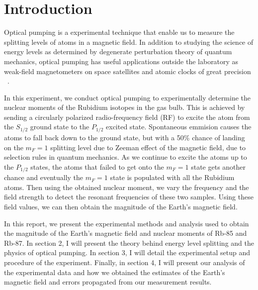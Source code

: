 \documentclass{sigchi}
\begin{document}
\section{Introduction}\label{sec:intro}
\par Optical pumping is a experimental technique that enable us to measure the splitting levels of  atoms in a magnetic field.  In addition to studying the science of energy levels as determined by degenerate perturbation theory of quantum mechanics, optical pumping has useful applications outside the laboratory as weak-field magnetometers on space satellites and atomic clocks of great precision ~\cite{opt}. 
\par In this experiment, we conduct optical pumping to experimentally determine the nuclear moments of the Rubidium isotopes in the gas bulb. This is achieved by sending a circularly polarized radio-frequency field (RF)  to excite the atom from the  $S_{1/2}$ ground state to the $P_{1/2}$ excited state. Spontaneous emmision causes the atoms to fall back down to the ground state, but with a 50\% chance of landing on the  $m_F=1$ splitting level due to Zeeman effect of the magnetic field, due to selection rules in quantum mechanics. As we continue to excite the atoms up to the $P_{1/2}$ states, the  atoms that failed to get onto the $m_F=1$ state gets another chance and eventually the $m_F=1$ state is populated with all the Rubidium atoms. Then using the obtained nuclear moment, we vary the frequency and the field strength to detect the resonant frequencies of these two samples. Using these field values, we can then obtain the magnitude of the Earth's magnetic field.
\par In this report, we present the experimental methods and analysis used to obtain the magnitude of the Earth's magnetic field and nuclear moments of Rb-85 and Rb-87. In section 2, I will present the theory behind energy level splitting and the physics of optical pumping. In section 3, I will detail the experimental setup and procedure of the experiment. Finally, in section 4,  I will present our analysis of the experimental data and how we obtained the estimates of the Earth's magnetic field and errors propagated from our measurement results. %
\end{document}
